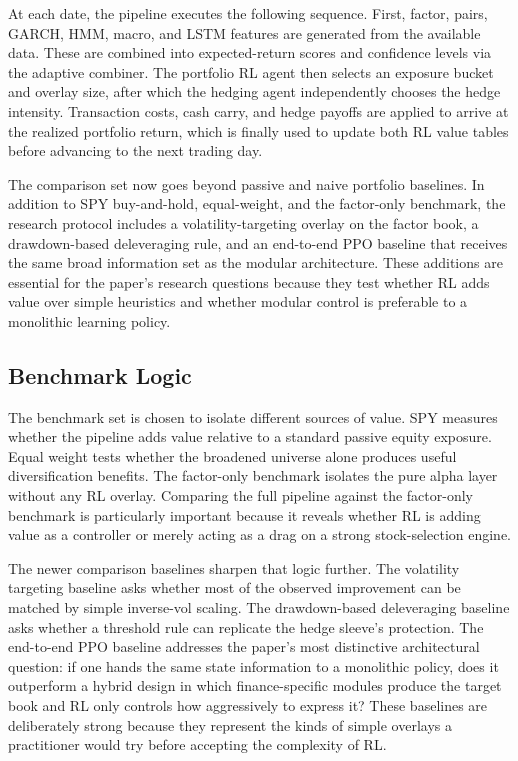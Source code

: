 \documentclass[10pt,twocolumn]{article}
\begin{document}
At each date, the pipeline executes the following sequence. First, factor, pairs,
GARCH, HMM, macro, and LSTM features are generated from the available data.
These are combined into expected-return scores and confidence levels via the
adaptive combiner. The portfolio RL agent then selects an exposure bucket and
overlay size, after which the hedging agent independently chooses the hedge
intensity. Transaction costs, cash carry, and hedge payoffs are applied to arrive
at the realized portfolio return, which is finally used to update both RL value
tables before advancing to the next trading day.

The comparison set now goes beyond passive and naive portfolio baselines. In
addition to SPY buy-and-hold, equal-weight, and the factor-only benchmark, the research
protocol includes a volatility-targeting overlay on the factor book, a
drawdown-based deleveraging rule, and an end-to-end PPO baseline that receives
the same broad information set as the modular architecture. These additions are
essential for the paper's research questions because they test whether RL adds
value over simple heuristics and whether modular control is preferable to a
monolithic learning policy.

\subsection{Benchmark Logic}

The benchmark set is chosen to isolate different sources of value. SPY measures
whether the pipeline adds value relative to a standard passive equity exposure.
Equal weight tests whether the broadened universe alone produces useful
diversification benefits. The factor-only benchmark isolates the pure alpha layer without any
RL overlay. Comparing the full pipeline against the factor-only benchmark is particularly
important because it reveals whether RL is adding value as a controller or merely
acting as a drag on a strong stock-selection engine.

The newer comparison baselines sharpen that logic further. The volatility
targeting baseline asks whether most of the observed improvement can be matched
by simple inverse-vol scaling. The drawdown-based deleveraging baseline asks
whether a threshold rule can replicate the hedge sleeve's protection. The
end-to-end PPO
baseline addresses the paper's most distinctive architectural question: if one
hands the same state information to a monolithic policy, does it outperform a
hybrid design in which finance-specific modules produce the target book and RL
only controls how aggressively to express it?
These baselines are deliberately strong because they represent the kinds of
simple overlays a practitioner would try before accepting the complexity of RL.
\end{document}
